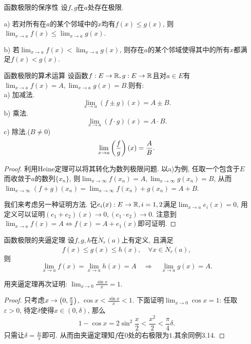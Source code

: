 \begin{proposition}{函数极限的保序性}
	设$f,g$在$a$处存在极限.
	
	a) 若对所有在$a$的某个邻域中的$x$均有$f(x) \leq g(x)$, 则$\lim_{x \to a} f(x) \leq \lim_{x \to a} g(x) $.
	
	b) 若$\lim_{x \to a} f(x) < \lim_{x \to a} g(x) $, 则存在$a$的某个邻域使得其中的所有$x$都满足$f(x) < g(x)$. 
\end{proposition}

\begin{theorem}{函数极限的算术运算}
	设函数$f:E \to \mathbb{R}, g:E\to \mathbb{R}$且对$a\in E$有$\lim_{x\to a} f(x) = A, \lim_{x\to a} g(x) = B$.则有:  \\
	a) 加减法. $$\lim_{x\to a} (f\pm g)(x) = A\pm B.$$
	b) 乘法. $$\lim_{x\to a} (f\cdot g)(x) = A \cdot B.$$
	c) 除法.($B\neq 0$) $$\lim_{x\to a} \left( \frac{f}{g} \right)(x) = \frac{A}{B}.$$
\end{theorem}
\begin{proof}
	利用Heine定理可以将其转化为数列极限问题. 以a)为例, 任取一个包含于$E$而收敛于$a$的数列$\{ x_n \}$, 则$\lim_{x\to \infty} f(x_n) = A,\lim_{x\to \infty} g(x_n) = B$, 从而$\lim_{x\to \infty} (f+g)(x_n) = \lim_{x\to \infty} f(x_n)+g(x_n) = A+B$. 
	
	我们来考虑另一种证明方法. 记$e_i(x):E \to \mathbb{R} ,i=1,2$满足$\lim_{x\to a} e_i(x)=0$, 用定义可以证明$(e_1+e_2)(x) \to 0 ,(e_1 \cdot e_2) \to 0$. 注意到$\lim_{x\to a} f(x) = A \Leftrightarrow f(x) = A+e_1(x)$即可证明. 
\end{proof}

\begin{theorem}{函数极限的夹逼定理}
	设$f,g,h$在$\mathring{N}_r(a)$上有定义, 且满足$$f(x) \leq g(x) \leq h(x), \quad \forall x \in \mathring{N}_r(a),$$则$$\lim_{x\to a}f(x) = \lim_{x\to a}h(x) = A \quad \Rightarrow \quad \lim_{x\to a}g(x)=A.$$
\end{theorem}

\begin{example}
	用夹逼定理再次证明: $\lim_{x\to 0} \frac{\sin x}{x} = 1$.
\end{example}
\begin{proof}
	只考虑$x\to \left( 0,\frac{\pi}{2} \right)$, $\cos x < \frac{\sin x}{x} < 1$. 下面证明$\lim_{x\to 0}\cos x=1$: 任取$\varepsilon >0$, 待定$\delta$使得$x \in (0,\delta)$, 那么$$1-\cos x = 2\sin ^2 \frac{x}{2} < \frac{x^2}{2}<\frac{\pi}{4}\delta .$$只需让$\delta = \frac{4\varepsilon}{\pi}$即可. 从而由夹逼定理知$f$在$0$处的右极限为$1$.其余同例3.14. 
\end{proof}



